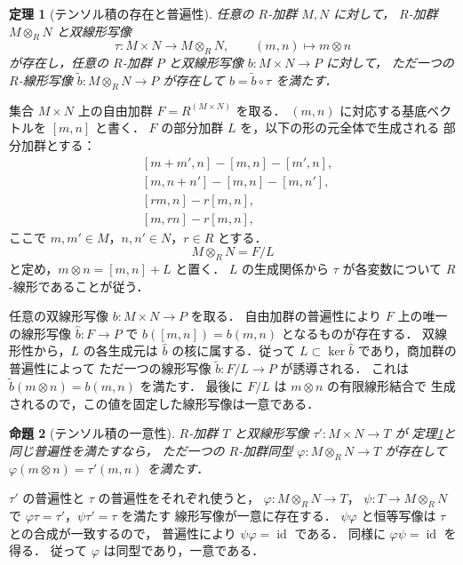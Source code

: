 \documentclass[a5paper,10pt,onecolumn]{jsarticle}
\makeatletter
\theoremstyle{mathnotetheorem}
\newtheorem{theorem}{定理}[section]
\newtheorem{proposition}[theorem]{命題}
\renewcommand{\proofname}{証明}
\renewenvironment{proof}[1][\proofname]{%
  \par\pushQED{\qed}\normalfont\topsep4\p@\@plus2\p@\relax
  \trivlist\item[\hskip\labelsep\bfseries #1]\ignorespaces
}{\popQED\endtrivlist\@endpefalse}
\makeatother
\begin{document}
\begin{theorem}[テンソル積の存在と普遍性]\label{thm:tensor}
任意の $R$-加群 $M,N$ に対して，
$R$-加群 $M\otimes_RN$ と双線形写像
\[
 \tau:M\times N\to M\otimes_RN,\qquad
 (m,n)\longmapsto m\otimes n
\]
が存在し，任意の $R$-加群 $P$ と双線形写像
$b:M\times N\to P$ に対して，
ただ一つの $R$-線形写像
$\widetilde b:M\otimes_RN\to P$ が存在して
$b=\widetilde b\circ\tau$ を満たす．
\end{theorem}
\begin{proof}
集合 $M\times N$ 上の自由加群
$F=R^{(M\times N)}$ を取る．
$(m,n)$ に対応する基底ベクトルを $[m,n]$ と書く．
$F$ の部分加群 $L$ を，以下の形の元全体で生成される
部分加群とする：
\begin{align*}
 &[m+m',n]-[m,n]-[m',n],\\
 &[m,n+n']-[m,n]-[m,n'],\\
 &[rm,n]-r[m,n],\\
 &[m,rn]-r[m,n],
\end{align*}
ここで $m,m'\in M$，$n,n'\in N$，$r\in R$ とする．
\[
 M\otimes_RN=F/L
\]
と定め，$m\otimes n=[m,n]+L$ と置く．
$L$ の生成関係から
$\tau$ が各変数について $R$-線形であることが従う．

任意の双線形写像 $b:M\times N\to P$ を取る．
自由加群の普遍性により
$F$ 上の唯一の線形写像
$\widehat b:F\to P$ で
$\widehat b([m,n])=b(m,n)$ となるものが存在する．
双線形性から，$L$ の各生成元は
$\widehat b$ の核に属する．従って $L\subset\ker\widehat b$
であり，商加群の普遍性によって
ただ一つの線形写像
$\widetilde b:F/L\to P$ が誘導される．
これは
$\widetilde b(m\otimes n)=b(m,n)$ を満たす．
最後に $F/L$ は $m\otimes n$ の有限線形結合で
生成されるので，この値を固定した線形写像は一意である．
\end{proof}

\begin{proposition}[テンソル積の一意性]\label{prop:tensor-unique}
$R$-加群 $T$ と双線形写像
$\tau':M\times N\to T$ が
定理\ref{thm:tensor}と同じ普遍性を満たすなら，
ただ一つの $R$-加群同型
$\varphi:M\otimes_RN\to T$ が存在して
$\varphi(m\otimes n)=\tau'(m,n)$ を満たす．
\end{proposition}
\begin{proof}
$\tau'$ の普遍性と $\tau$ の普遍性をそれぞれ使うと，
$\varphi:M\otimes_RN\to T$，
$\psi:T\to M\otimes_RN$ で
$\varphi\tau=\tau'$，$\psi\tau'=\tau$ を満たす
線形写像が一意に存在する．
$\psi\varphi$ と恒等写像は $\tau$ との合成が一致するので，
普遍性により $\psi\varphi=\operatorname{id}$ である．
同様に $\varphi\psi=\operatorname{id}$ を得る．
従って $\varphi$ は同型であり，一意である．
\end{proof}
\end{document}
